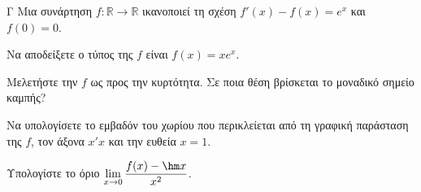 \begin{thema}{Γ}
Μια συνάρτηση $f: \mathbb{R} \to \mathbb{R}$ ικανοποιεί τη σχέση $f'(x) - f(x) = e^x$ και $f(0) = 0$.
\begin{erwthma}
  \item Να αποδείξετε ο τύπος της $f$ είναι $f(x) = x e^x$.
  \item Μελετήστε την $f$ ως προς την κυρτότητα. Σε ποια θέση βρίσκεται το μοναδικό σημείο καμπής?
  \item Να υπολογίσετε το εμβαδόν του χωρίου που περικλείεται από τη γραφική παράσταση της $f$, τον άξονα $x'x$ και την ευθεία $x=1$.
  \item Υπολογίστε το όριο $\lim\limits_{x \to 0} \dfrac{f(x) - \hm x}{x^2}$.
\end{erwthma}
\end{thema}
